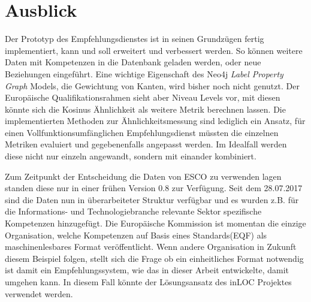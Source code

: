 \section{Ausblick}\label{ausblick}

Der Prototyp des Empfehlungsdienstes ist in seinen Grundzügen fertig implementiert, kann und soll erweitert und verbessert werden. So können weitere Daten mit Kompetenzen in die Datenbank geladen werden, oder neue Beziehungen eingeführt. Eine wichtige Eigenschaft des Neo4j \textit{Label Property Graph} Models, die Gewichtung von Kanten, wird bisher noch nicht genutzt. Der Europäische Qualifikationsrahmen sieht aber Niveau Levels vor, mit diesen könnte sich die Kosinus Ähnlichkeit als weitere Metrik berechnen lassen. 
Die implementierten Methoden zur Ähnlichkeitsmessung sind lediglich ein Ansatz, für einen Vollfunktionsumfänglichen Empfehlungsdienst müssten die einzelnen Metriken evaluiert und gegebenenfalls angepasst werden. Im Idealfall werden diese nicht nur einzeln angewandt, sondern mit einander kombiniert. \newline

  Zum Zeitpunkt der Entscheidung die Daten von ESCO zu verwenden lagen standen diese nur in einer frühen Version 0.8 zur Verfügung. Seit dem 28.07.2017 sind die Daten nun in überarbeiteter Struktur verfügbar und es wurden z.B. für die Informations- und Technologiebranche relevante Sektor spezifische Kompetenzen hinzugefügt. 
  \newline
 Die Europäische Kommission ist momentan die einzige Organisation, welche Kompetenzen auf Basis eines Standards(EQF) als maschinenlesbares Format veröffentlicht. Wenn andere Organisation in Zukunft diesem Beispiel folgen, stellt sich die Frage ob ein einheitliches Format notwendig ist damit ein Empfehlungssystem, wie das in dieser Arbeit entwickelte, damit umgehen kann. In diesem Fall könnte der Lösungsansatz des inLOC Projektes verwendet werden. 